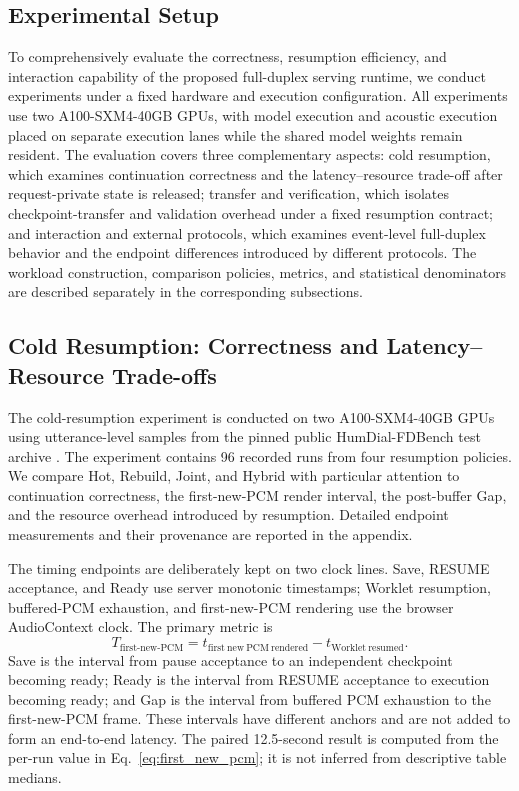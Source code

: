 \documentclass{article}
\begin{document}
\subsection{Experimental Setup}
\label{sec:exp_setup}

To comprehensively evaluate the correctness, resumption efficiency, and
interaction capability of the proposed full-duplex serving runtime, we
conduct experiments under a fixed hardware and execution
configuration. All experiments use two A100-SXM4-40GB GPUs, with model
execution and acoustic execution placed on separate execution lanes
while the shared model weights remain resident. The evaluation covers
three complementary aspects: cold resumption, which examines
continuation correctness and the latency--resource trade-off after
request-private state is released; transfer and verification, which
isolates checkpoint-transfer and validation overhead under a fixed resumption
contract; and interaction and external protocols, which examines
event-level full-duplex behavior and the endpoint differences
introduced by different protocols. The workload
construction, comparison policies, metrics, and statistical
denominators are described separately in the corresponding
subsections.

\subsection{Cold Resumption: Correctness and Latency--Resource Trade-offs}
\label{sec:cold_resumption}

The cold-resumption experiment is conducted on two
A100-SXM4-40GB GPUs using utterance-level samples from the pinned public
HumDial-FDBench test archive \citep{humdial2026,humdialdataset2026}. The
experiment contains 96 recorded runs from four resumption
policies. We compare Hot, Rebuild, Joint, and Hybrid with particular
attention to continuation correctness, the first-new-PCM render interval,
the post-buffer Gap, and the resource overhead introduced by resumption. Detailed endpoint measurements and their provenance are
reported in the appendix.

The timing endpoints are deliberately kept on two clock lines. Save,
RESUME acceptance, and Ready use server monotonic timestamps; Worklet
resumption, buffered-PCM exhaustion, and first-new-PCM rendering use the
browser AudioContext clock. The primary metric is
\begin{equation}
 T_{\mathrm{first\text{-}new\text{-}PCM}}
 = t_{\mathrm{first\ new\ PCM\ rendered}}
   - t_{\mathrm{Worklet\ resumed}} .
 \label{eq:first_new_pcm}
\end{equation}
Save is the interval from pause acceptance to an independent checkpoint
becoming ready; Ready is the interval from RESUME acceptance to execution
becoming ready; and Gap is the interval from buffered PCM exhaustion to the
first-new-PCM frame.
These intervals have different anchors and are not added to form an
end-to-end latency. The paired 12.5-second result is computed from the
per-run value in Eq.~\eqref{eq:first_new_pcm}; it is not inferred from
descriptive table medians.
\end{document}
